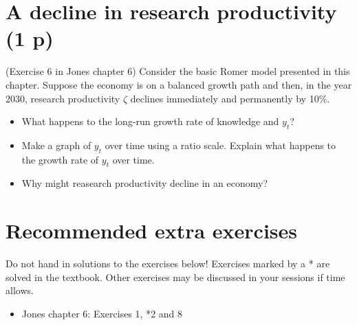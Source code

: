 \documentclass[12pt,a4paper]{article}
\begin{document}
\section{A decline in research productivity (1 p)}
(Exercise 6 in Jones chapter 6)
Consider the basic Romer model presented in this chapter. Suppose the economy is on a balanced growth path and then, in the year 2030, research productivity $\zeta$ declines immediately and permanently by 10\%.
\begin{itemize}
    \item[a.] What happens to the long-run growth rate of knowledge and $y_t$?
    \item[b.] Make a graph of $y_t$ over time using a ratio scale. Explain what happens to the growth rate of $y_t$ over time.
    \item[c.] Why might reasearch productivity decline in an economy?
\end{itemize}



\section*{Recommended extra exercises }
Do not hand in solutions to the exercises below! Exercises marked by a * are solved in the textbook. Other exercises may be discussed in your sessions if time allows. 

\begin{itemize}
    \item Jones chapter 6: Exercises 1, *2 and 8
\end{itemize}
\end{document}

